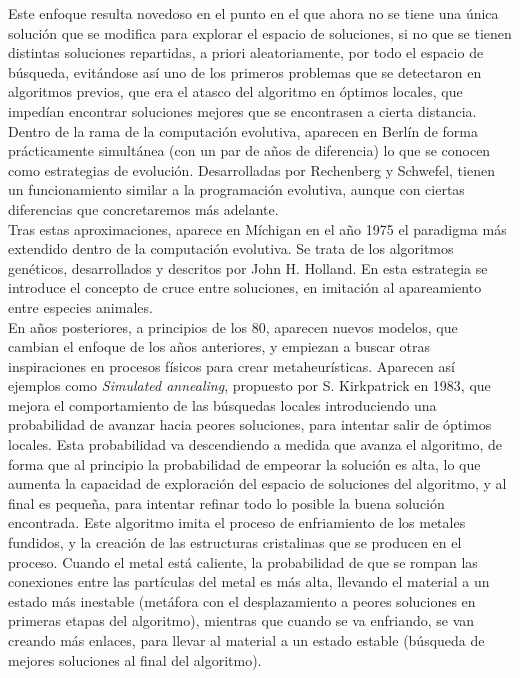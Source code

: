 \documentclass[12pt]{article} \usepackage[utf8]{inputenc}
\begin{document}
Este enfoque resulta novedoso en el punto en el que ahora no se tiene
una única solución que se modifica para explorar el espacio de
soluciones, si no que se tienen distintas soluciones repartidas, a
priori aleatoriamente, por todo el espacio de búsqueda, evitándose así
uno de los primeros problemas que se detectaron en algoritmos previos,
que era el atasco del algoritmo en óptimos locales, que impedían
encontrar soluciones mejores que se encontrasen a cierta distancia.\\

Dentro de la rama de la computación evolutiva, aparecen en Berlín de
forma prácticamente simultánea (con un par de años de diferencia) lo
que se conocen como estrategias de evolución. Desarrolladas por
Rechenberg y Schwefel, tienen un funcionamiento similar a la
programación evolutiva, aunque con ciertas diferencias que
concretaremos más adelante.\\

Tras estas aproximaciones, aparece en Míchigan en el año 1975 el
paradigma más extendido dentro de la computación evolutiva. Se trata
de los algoritmos genéticos, desarrollados y descritos por John H.
Holland. En esta estrategia se introduce el concepto de cruce entre
soluciones, en imitación al apareamiento entre especies animales.\\

En años posteriores, a principios de los 80, aparecen nuevos modelos,
que cambian el enfoque de los años anteriores, y empiezan a buscar
otras inspiraciones en procesos físicos para crear metaheurísticas.
Aparecen así ejemplos como \textit{Simulated annealing}, propuesto por
S. Kirkpatrick en 1983, que mejora el comportamiento de las búsquedas
locales introduciendo una probabilidad de avanzar hacia peores
soluciones, para intentar salir de óptimos locales. Esta probabilidad
va descendiendo a medida que avanza el algoritmo, de forma que al
principio la probabilidad de empeorar la solución es alta, lo que
aumenta la capacidad de exploración del espacio de soluciones del
algoritmo, y al final es pequeña, para intentar refinar todo lo
posible la buena solución encontrada. Este algoritmo imita el proceso
de enfriamiento de los metales fundidos, y la creación de las
estructuras cristalinas que se producen en el proceso. Cuando el metal
está caliente, la probabilidad de que se rompan las conexiones entre
las partículas del metal es más alta, llevando el material a un estado
más inestable (metáfora con el desplazamiento a peores soluciones en
primeras etapas del algoritmo), mientras que cuando se va enfriando,
se van creando más enlaces, para llevar al material a un estado
estable (búsqueda de mejores soluciones al final del algoritmo).\\
\end{document}
